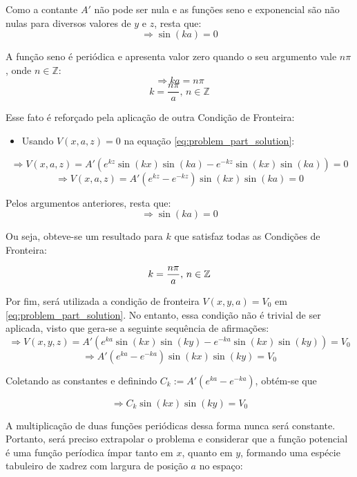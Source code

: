 \documentclass{report}
\begin{document}
Como a contante $ A' $ não pode ser nula e as funções seno e exponencial são não nulas para diversos valores de $ y $ e $ z $, resta que:
$$ \Rightarrow \sin(ka) = 0 $$

A função seno é periódica e apresenta valor zero quando o seu argumento vale $ n\pi $, onde $ n \in \mathbb{Z} $:
$$ \Rightarrow ka = n\pi $$
$$ k = \frac{n\pi}{a},\, n \in \mathbb{Z} $$

Esse fato é reforçado pela aplicação de outra Condição de Fronteira:

\begin{itemize}
  \item Usando $ V(x, a, z) = 0 $ na equação \ref{eq:problem_part_solution}:
\end{itemize}
$$ \Rightarrow V(x, a, z) = A'(e^{kz}\sin(kx)\sin(ka) - e^{-kz}\sin(kx)\sin(ka)) = 0 $$
$$ \Rightarrow V(x, a, z) = A'(e^{kz} - e^{-kz})\sin(kx)\sin(ka) = 0 $$

Pelos argumentos anteriores, resta que:
$$ \Rightarrow \sin(ka) = 0 $$

Ou seja, obteve-se um resultado para $ k $ que satisfaz todas as Condições de Fronteira:

\begin{equation}
    \label{eq:k_values}
    \centering
    k = \frac{n\pi}{a},\, n \in \mathbb{Z}
\end{equation}

Por fim, será utilizada a condição de fronteira $ V(x, y, a) = V_0 $ em \ref{eq:problem_part_solution}.
No entanto, essa condição não é trivial de ser aplicada, visto que gera-se
a seguinte sequência de afirmações:
$$ \Rightarrow V(x, y, z) = A'(e^{ka}\sin(kx)\sin(ky) - e^{-ka}\sin(kx)\sin(ky)) = V_0 $$
$$ \Rightarrow A'(e^{ka} - e^{-ka})\sin(kx)\sin(ky) = V_0 $$

Coletando as constantes e definindo $ C_{k} := A'(e^{ka} - e^{-ka}) $, obtém-se que

$$ \Rightarrow C_{k}\sin(kx)\sin(ky) = V_0 $$

A multiplicação de duas funções periódicas dessa forma nunca será constante. Portanto, será
preciso extrapolar o problema e considerar que a função potencial é uma função períodica ímpar tanto em
$ x $, quanto em $ y $, formando uma espécie tabuleiro de xadrez com largura de posição $ a $ no espaço:
\end{document}

